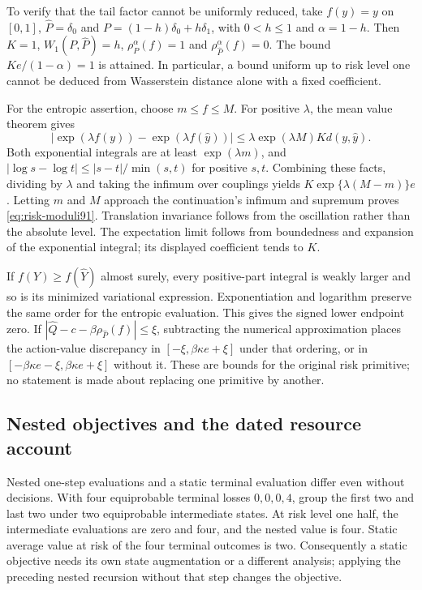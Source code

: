 To verify that the tail factor cannot be uniformly reduced, take $f(y)=y$ on $[0,1]$, $\widehat P=\delta_0$ and $P=(1-h)\delta_0+h\delta_1$, with $0<h\le1$ and $\alpha=1-h$. Then $K=1$, $W_1(P,\widehat P)=h$, $\rho_P^\alpha(f)=1$ and $\rho_{\widehat P}^\alpha(f)=0$. The bound $Ke/(1-\alpha)=1$ is attained. In particular, a bound uniform up to risk level one cannot be deduced from Wasserstein distance alone with a fixed coefficient.

For the entropic assertion, choose $m\le f\le M$. For positive $\lambda$, the mean value theorem gives
\[
 |\exp(\lambda f(y))-\exp(\lambda f(\widehat y))|
 \le\lambda\exp(\lambda M)K d(y,\widehat y).
\]
Both exponential integrals are at least $\exp(\lambda m)$, and
$|\log s-\log t|\le |s-t|/\min(s,t)$ for positive $s,t$. Combining these facts, dividing by $\lambda$ and taking the infimum over couplings yields $K\exp\{\lambda(M-m)\}e$. Letting $m$ and $M$ approach the continuation's infimum and supremum proves \eqref{eq:risk-moduli91}. Translation invariance follows from the oscillation rather than the absolute level. The expectation limit follows from boundedness and expansion of the exponential integral; its displayed coefficient tends to $K$.

If $f(Y)\ge f(\widehat Y)$ almost surely, every positive-part integral is weakly larger and so is its minimized variational expression. Exponentiation and logarithm preserve the same order for the entropic evaluation. This gives the signed lower endpoint zero. If $|\widehat Q-c-\beta\rho_{\widehat P}(f)|\le\xi$, subtracting the numerical approximation places the action-value discrepancy in $[-\xi,\beta\kappa e+\xi]$ under that ordering, or in $[-\beta\kappa e-\xi,\beta\kappa e+\xi]$ without it. These are bounds for the original risk primitive; no statement is made about replacing one primitive by another.

\subsection{Nested objectives and the dated resource account}
Nested one-step evaluations and a static terminal evaluation differ even without decisions. With four equiprobable terminal losses $0,0,0,4$, group the first two and last two under two equiprobable intermediate states. At risk level one half, the intermediate evaluations are zero and four, and the nested value is four. Static average value at risk of the four terminal outcomes is two. Consequently a static objective needs its own state augmentation or a different analysis; applying the preceding nested recursion without that step changes the objective.

